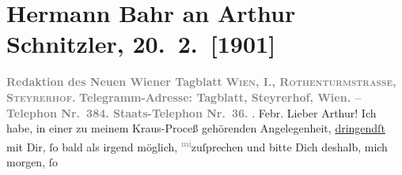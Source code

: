 

         
         \renewcommand{\erwaehntePersonen}{Personen: Emerich von Bukovics, Karl Kraus}
         \renewcommand{\erwaehnteInstitutionen}{Institutionen: Neues Wiener Tagblatt}
         \renewcommand{\erwaehnteOrte}{Orte: Ober Sankt Veit, Steyrerhof, Wien}
         \renewcommand{\erwaehnteWerke}{}
               \section[Hermann Bahr an Arthur Schnitzler, 20. 2. {[}1901{]}]{ Hermann Bahr an Arthur Schnitzler, 20. 2. {[}1901{]}}\nopagebreak{}\rehead{ }\begin{ledgroupsized}[t]{13cm}\normalsize\beginnumbering \toendnotes[C]{\smallbreak\pagebreak[2]} 
\toendnotes[C]{\smallbreak}\pstart
           \noindent{}\centering{}{\pb}\textcolor{gray}{\textbf{Redaktion des Neuen Wiener Tagblatt}}\pend
           \pstart
           \noindent{}\centering{}\textcolor{gray}{\textbf{\textsc{Wien, I., Rothenturmstrasse,
                        Steyrerhof.}}}\pend
           \pstart
           \noindent{}\centering{}\textcolor{gray}{\textbf{Telegramm-Adresse: Tagblatt,
                        Steyrerhof, Wien. – Telephon Nr. 384.
                     Staats-Telephon Nr. 36.}}\pend
           . Febr.\pend
           \pstart\center{}Lieber Arthur!\pend\pstart
           Ich habe, in einer zu meinem Kraus-Proceß
               gehörenden Angelegenheit, \uline{dringendſt} mit Dir, ſo bald
               als irgend möglich, \substVorne{}\textsuperscript{\textcolor{gray}{mi}}\substDazwischen{}zu\substHinten{}{ }ſprechen und bitte Dich deshalb, mich morgen, ſo

\end{ledgroupsized}
